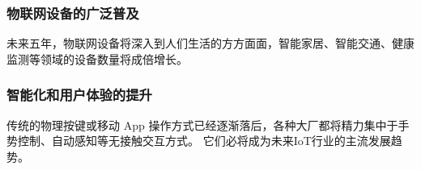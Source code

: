 \documentclass[UTF8]{homework}
\begin{document}
\begin{homeworkProblem}
\subsubsection{物联网设备的广泛普及}
未来五年，物联网设备将深入到人们生活的方方面面，智能家居、智能交通、健康监测等领域的设备数量将成倍增长。

\subsubsection{智能化和用户体验的提升}
传统的物理按键或移动 App 操作方式已经逐渐落后，各种大厂都将精力集中于手势控制、自动感知等无接触交互方式。
它们必将成为未来IoT行业的主流发展趋势。

\end{homeworkProblem}



\end{document}
